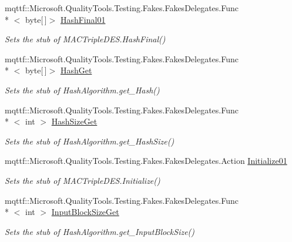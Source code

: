 \begin{DoxyCompactItemize}
mqttf\-::\-Microsoft.\-Quality\-Tools.\-Testing.\-Fakes.\-Fakes\-Delegates.\-Func\\*
$<$ byte\mbox{[}$\,$\mbox{]}$>$ \hyperlink{class_system_1_1_security_1_1_cryptography_1_1_fakes_1_1_stub_m_a_c_triple_d_e_s_a0e0b5e0e3585649ec3b7770208ad7ea5}{Hash\-Final01}
\begin{DoxyCompactList}\small\item\em Sets the stub of M\-A\-C\-Triple\-D\-E\-S.\-Hash\-Final()\end{DoxyCompactList}\item 
mqttf\-::\-Microsoft.\-Quality\-Tools.\-Testing.\-Fakes.\-Fakes\-Delegates.\-Func\\*
$<$ byte\mbox{[}$\,$\mbox{]}$>$ \hyperlink{class_system_1_1_security_1_1_cryptography_1_1_fakes_1_1_stub_m_a_c_triple_d_e_s_a5146979f296226d63a3a083eded74c0c}{Hash\-Get}
\begin{DoxyCompactList}\small\item\em Sets the stub of Hash\-Algorithm.\-get\-\_\-\-Hash()\end{DoxyCompactList}\item 
mqttf\-::\-Microsoft.\-Quality\-Tools.\-Testing.\-Fakes.\-Fakes\-Delegates.\-Func\\*
$<$ int $>$ \hyperlink{class_system_1_1_security_1_1_cryptography_1_1_fakes_1_1_stub_m_a_c_triple_d_e_s_a81f250776471579d62e272d641964d68}{Hash\-Size\-Get}
\begin{DoxyCompactList}\small\item\em Sets the stub of Hash\-Algorithm.\-get\-\_\-\-Hash\-Size()\end{DoxyCompactList}\item 
mqttf\-::\-Microsoft.\-Quality\-Tools.\-Testing.\-Fakes.\-Fakes\-Delegates.\-Action \hyperlink{class_system_1_1_security_1_1_cryptography_1_1_fakes_1_1_stub_m_a_c_triple_d_e_s_abb37472a1de3f6c4f34c8bd84eda2ce8}{Initialize01}
\begin{DoxyCompactList}\small\item\em Sets the stub of M\-A\-C\-Triple\-D\-E\-S.\-Initialize()\end{DoxyCompactList}\item 
mqttf\-::\-Microsoft.\-Quality\-Tools.\-Testing.\-Fakes.\-Fakes\-Delegates.\-Func\\*
$<$ int $>$ \hyperlink{class_system_1_1_security_1_1_cryptography_1_1_fakes_1_1_stub_m_a_c_triple_d_e_s_a598b2e9e512ab245534b715f31caa862}{Input\-Block\-Size\-Get}
\begin{DoxyCompactList}\small\item\em Sets the stub of Hash\-Algorithm.\-get\-\_\-\-Input\-Block\-Size()\end{DoxyCompactList}\item 

\end{DoxyCompactItemize}
